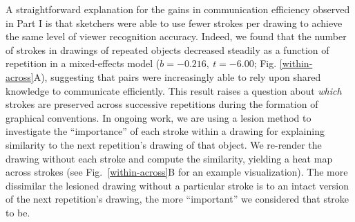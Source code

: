 \documentclass[10pt,letterpaper]{article}
\newcommand{\jefan}[1]{\textcolor{Blue}{jefan: #1}}
\begin{document}
A straightforward explanation for the gains in communication efficiency observed in Part I is that sketchers were able to use fewer strokes per drawing to achieve the same level of viewer recognition accuracy.
Indeed, we found that the number of strokes in drawings of repeated objects decreased steadily as a function of repetition in a mixed-effects model ($b = -0.216, ~t = -6.00$; Fig. \ref{within-across}A), %
suggesting that pairs were increasingly able to rely upon shared knowledge to communicate efficiently.
This result raises a question about \emph{which} strokes are preserved across successive repetitions during the formation of graphical conventions.
In ongoing work, we are using a lesion method to investigate the ``importance'' of each stroke within a drawing for explaining similarity to the next repetition's drawing of that object.
We re-render the drawing without each stroke and compute the similarity, yielding a heat map across strokes (see Fig.~\ref{within-across}B for an example visualization).
The more dissimilar the lesioned drawing without a particular stroke is to an intact version of the next repetition's drawing, the more ``important'' we considered that stroke to be.




\end{document}
